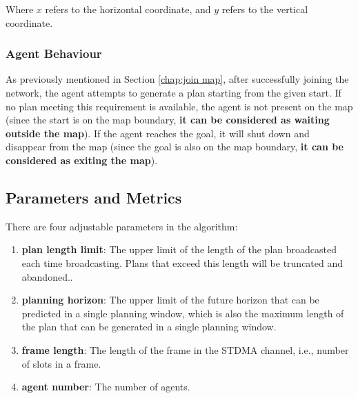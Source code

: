 Where $x$ refers to the horizontal coordinate, and $y$ refers to the vertical coordinate.

\subsubsection{Agent Behaviour}

As previously mentioned in Section \ref{chap:join map}, after successfully joining the network, the agent attempts to generate a plan starting from the given start. If no plan meeting this requirement is available, the agent is not present on the map (since the start is on the map boundary, \textbf{it can be considered as waiting outside the map}).
If the agent reaches the goal, it will shut down and disappear from the map (since the goal is also on the map boundary, \textbf{it can be considered as exiting the map}).

\subsection*{Parameters and Metrics}
There are four adjustable parameters in the algorithm: 
\begin{enumerate}
    \item \textbf{plan length limit}: The upper limit of the length of the plan broadcasted each time broadcasting. Plans that exceed this length will be truncated and abandoned..
    \item \textbf{planning horizon}: The upper limit of the future horizon that can be predicted in a single planning window, which is also the maximum length of the plan that can be generated in a single planning window.
    \item \textbf{frame length}: The length of the frame in the STDMA channel, i.e., number of slots in a frame.
    \item \textbf{agent number}: The number of agents.
\end{enumerate}

